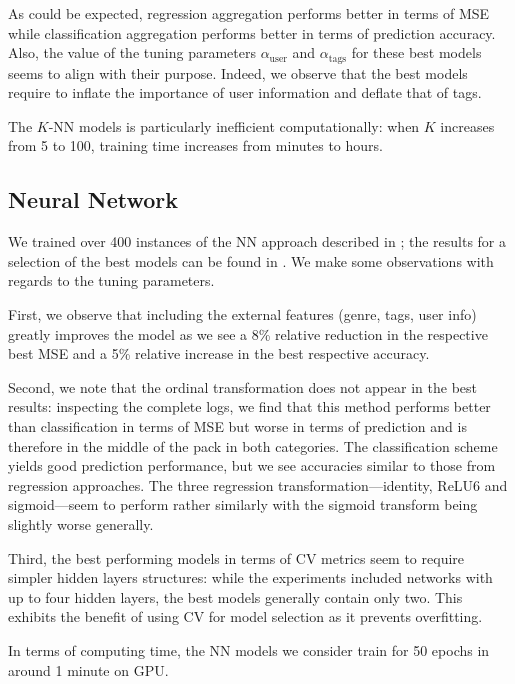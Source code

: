 \documentclass[bj, preprint]{imsart}
\begin{document}
As could be expected, regression aggregation performs better in terms of MSE while classification aggregation performs better in terms of prediction accuracy. Also, the value of the tuning parameters $\alpha_\text{user}$ and $\alpha_\text{tags}$ for these best models seems to align with their purpose. Indeed, we observe that the best models require to inflate the importance of user information and deflate that of tags.

The  $K$-NN models is particularly inefficient computationally: when $K$ increases from 5 to 100, training time increases from minutes to hours.




\subsection{Neural Network}\label{sebsec:results.nn}

We trained over 400 instances of the NN approach described in ; the results for a selection of the best models can be found in . We make some observations with regards to the tuning parameters.

First, we observe that including the external features (genre, tags, user info) greatly improves the model as we see a 8\% relative reduction in the respective best MSE and a 5\% relative increase in the best respective accuracy. 

Second, we note that the ordinal transformation does not appear in the best results: inspecting the complete logs, we find that this method performs better than classification in terms of MSE but worse in terms of prediction and is therefore in the middle of the pack in both categories. The classification scheme yields good prediction performance, but we see accuracies similar to those from regression approaches. The three regression transformation---identity, ReLU6 and sigmoid---seem to perform rather similarly with the sigmoid transform being slightly worse generally.

Third, the best performing models in terms of CV metrics seem to require simpler hidden layers structures: while the experiments included networks with up to four hidden layers, the best models generally contain only two. This exhibits the benefit of using CV for model selection as it prevents overfitting.

In terms of computing time, the NN models we consider train for 50 epochs in around 1 minute on GPU.
\end{document}
